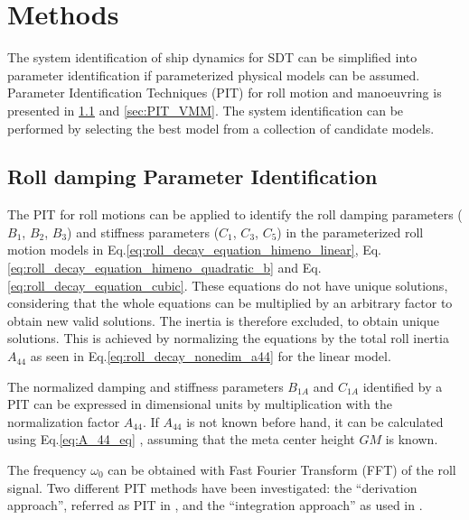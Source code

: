 \chapter{Methods\label{ch:methods}}
The system identification of ship dynamics for SDT can be simplified into parameter identification if parameterized physical models can be assumed. Parameter Identification Techniques (PIT) for roll motion and manoeuvring is presented in \ref{sec:PIT_roll} and \ref{sec:PIT_VMM}. The system identification can be performed by selecting the best model from a collection of candidate models.

\section{Roll damping Parameter Identification} \label{sec:PIT_roll}
\noindent The PIT for roll motions can be applied to identify the roll damping parameters ($B_1$, $B_2$, $B_3$) and stiffness parameters ($C_1$, $C_3$, $C_5$) in the parameterized roll motion models in Eq.\ref{eq:roll_decay_equation_himeno_linear}, Eq.\ref{eq:roll_decay_equation_himeno_quadratic_b} and Eq.\ref{eq:roll_decay_equation_cubic}. These equations do not have unique solutions, considering that the whole equations can be multiplied by an arbitrary factor to obtain new valid solutions. The inertia is therefore excluded, to obtain unique solutions. This is achieved by normalizing the equations by the total roll inertia $A_{44}$ as seen in Eq.\ref{eq:roll_decay_nonedim_a44} for the linear model.



\noindent The normalized damping and stiffness parameters $B_{1A}$ and $C_{1A}$ identified by a PIT can be expressed in dimensional units by multiplication with the normalization factor $A_{44}$. If $A_{44}$ is not known before hand, it can be calculated using Eq.\ref{eq:A_44_eq} \cite{piehl_ship_2016}, assuming that the meta center height $GM$ is known.


\noindent The frequency $\omega_0$ can be obtained with Fast Fourier Transform (FFT) of the roll signal. 
Two different PIT methods have been investigated: the ``derivation approach'', referred as PIT in \parencite{imo_1200_2006}, and the ``integration approach'' as used in \cite{soder_assessment_2019}. 

